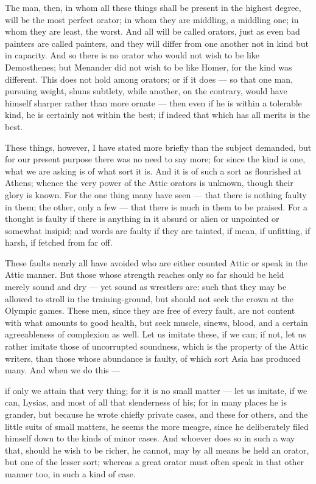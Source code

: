  The man, then, in whom all these things shall be present in the highest degree, will be the most perfect orator; in whom they are middling, a middling one; in whom they are least, the worst. And all will be called orators, just as even bad painters are called painters, and they will differ from one another not in kind but in capacity. And so there is no orator who would not wish to be like Demosthenes; but Menander did not wish to be like Homer, for the kind was different. This does not hold among orators; or if it does --- so that one man, pursuing weight, shuns subtlety, while another, on the contrary, would have himself sharper rather than more ornate --- then even if he is within a tolerable kind, he is certainly not within the best; if indeed that which has all merits is the best.

 These things, however, I have stated more briefly than the subject demanded, but for our present purpose there was no need to say more; for since the kind is one, what we are asking is of what sort it is. And it is of such a sort as flourished at Athens; whence the very power of the Attic orators is unknown, though their glory is known. For the one thing many have seen --- that there is nothing faulty in them; the other, only a few --- that there is much in them to be praised. For a thought is faulty if there is anything in it absurd or alien or unpointed or somewhat insipid; and words are faulty if they are tainted, if mean, if unfitting, if harsh, if fetched from far off.

 These faults nearly all have avoided who are either counted Attic or speak in the Attic manner. But those whose strength reaches only so far should be held merely sound and dry --- yet sound as wrestlers are: such that they may be allowed to stroll in the training-ground, but should not seek the crown at the Olympic games. These men, since they are free of every fault, are not content with what amounts to good health, but seek muscle, sinews, blood, and a certain agreeableness of complexion as well. Let us imitate these, if we can; if not, let us rather imitate those of uncorrupted soundness, which is the property of the Attic writers, than those whose abundance is faulty, of which sort Asia has produced many. And when we do this ---

 if only we attain that very thing; for it is no small matter --- let us imitate, if we can, Lysias, and most of all that slenderness of his; for in many places he is grander, but because he wrote chiefly private cases, and these for others, and the little suits of small matters, he seems the more meagre, since he deliberately filed himself down to the kinds of minor cases. And whoever does so in such a way that, should he wish to be richer, he cannot, may by all means be held an orator, but one of the lesser sort; whereas a great orator must often speak in that other manner too, in such a kind of case.

